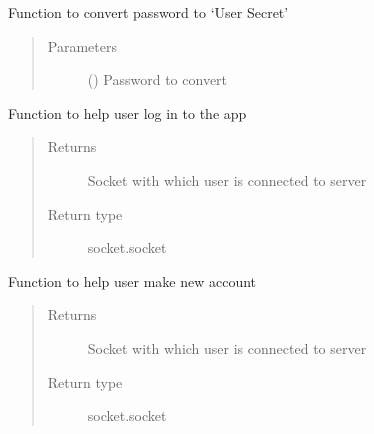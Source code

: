 \documentclass[letterpaper,10pt,english]{sphinxmanual}
\begin{document}

\begin{fulllineitems}
\label{\detokenize{app:app.getUserSecretFromPassword}}
Function to convert password to ‘User Secret’
\begin{quote}\begin{description}
\item[{Parameters}] \leavevmode
{} () \textendash{} Password to convert

\end{description}\end{quote}

\end{fulllineitems}


\begin{fulllineitems}
\label{\detokenize{app:app.login}}
Function to help user log in to the app
\begin{quote}\begin{description}
\item[{Returns}] \leavevmode
Socket with which user is connected to server

\item[{Return type}] \leavevmode
socket.socket

\end{description}\end{quote}

\end{fulllineitems}


\begin{fulllineitems}
\label{\detokenize{app:app.signup}}
Function to help user make new account
\begin{quote}\begin{description}
\item[{Returns}] \leavevmode
Socket with which user is connected to server

\item[{Return type}] \leavevmode
socket.socket

\end{description}\end{quote}

\end{fulllineitems}
\end{document}
